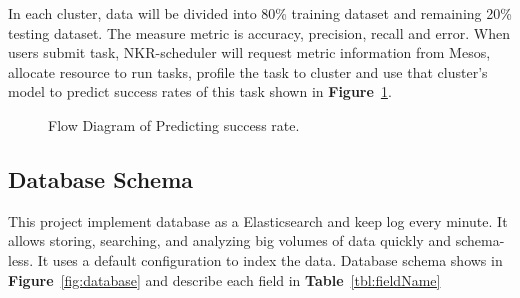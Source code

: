 \documentclass[12pt,oneside,openright,a4paper]{cpe-english-project}
\begin{document}
\begin{enumerate}
In each cluster, data will be divided into 80\% training dataset and remaining 20\% testing dataset. The measure metric is accuracy, precision, recall and error. When users submit task, NKR-scheduler will request metric information from Mesos, allocate resource to run tasks, profile the task to cluster and use that cluster’s model to predict success rates of this task shown in \textbf{Figure}~\ref{fig:flowDiagramPredict}.

\begin{figure}[!h]\centering
\setlength{\fboxrule}{0mm} %
\setlength{\fboxsep}{0cm}
\caption{Flow Diagram of Predicting success rate.}\label{fig:flowDiagramPredict}
\end{figure}

\end{enumerate}

\subsection{Database Schema}  

This project implement database as a Elasticsearch and keep log every minute. It allows storing, searching, and analyzing big volumes of data quickly and schema-less. It uses a default configuration to index the data. Database schema shows in \textbf{Figure}~\ref{fig:database} and describe each field in \textbf{Table}~\ref{tbl:fieldName}
\end{document}
